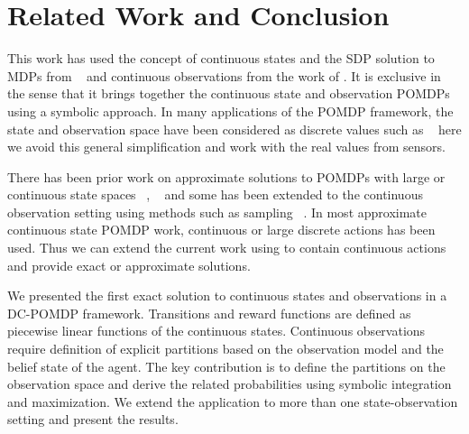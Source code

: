 \documentclass{article} %
\begin{document}
\section{Related Work and Conclusion} 
This work has used the concept of continuous states and the SDP solution to MDPs from ~\cite{sanner_uai11} and continuous observations from the work of \cite{pascal_ijcai05}. It is exclusive in the sense that it brings together the continuous state and observation POMDPs using a symbolic approach. 
In many applications of the POMDP framework, the state and observation space have been considered as discrete values such as ~\cite{steam2} here we avoid this general simplification and work with the real values from sensors.

There has been prior work on approximate solutions to POMDPs with large or continuous state spaces ~\cite{Thrun99h}, ~\cite{Perseus} and some has been extended to the continuous observation setting using methods such as sampling ~\cite{Perseus_cont}.
In most approximate continuous state POMDP work, continuous or large discrete actions has been used. Thus we can extend the current work using \cite{zamani_aaai12} to contain continuous actions and provide exact or approximate solutions. 

We presented the first exact solution to continuous states and observations in a DC-POMDP framework. Transitions and reward functions are defined as piecewise linear functions of the continuous states. Continuous observations require definition of explicit partitions based on the observation model and the belief state of the agent. The key contribution is to define the partitions on the observation space and derive the related probabilities using symbolic integration and maximization. We extend the application to more than one state-observation setting and present the results.  
 


\end{document}
